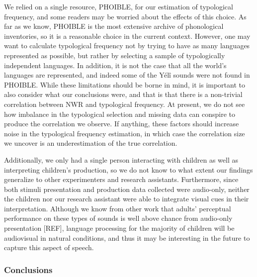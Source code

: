 \documentclass[
  english,
  ,man,floatsintext]{apa6}
\begin{document}
We relied on a single resource, PHOIBLE, for our estimation of typological frequency, and some readers may be worried about the effects of this choice. As far as we know, PHOIBLE is the most extensive archive of phonological inventories, so it is a reasonable choice in the current context. However, one may want to calculate typological frequency not by trying to have as many languages represented as possible, but rather by selecting a sample of typologically independent languages. In addition, it is not the case that all the world's languages are represented, and indeed some of the Yélî sounds were not found in PHOIBLE. While these limitations should be borne in mind, it is important to also consider what our conclusions were, and that is that there is a non-trivial correlation between NWR and typological frequency. At present, we do not see how imbalance in the typological selection and missing data can conspire to produce the correlation we observe. If anything, these factors should increase noise in the typological frequency estimation, in which case the correlation size we uncover is an underestimation of the true correlation.

Additionally, we only had a single person interacting with children as well as interpreting children's production, so we do not know to what extent our findings generalize to other experimenters and research assistants. Furthermore, since both stimuli presentation and production data collected were audio-only, neither the children nor our research assistant were able to integrate visual cues in their interpretation. Although we know from other work that adults' perceptual performance on these types of sounds is well above chance from audio-only presentation {[}REF{]}, language processing for the majority of children will be audiovisual in natural conditions, and thus it may be interesting in the future to capture this aspect of speech.

\hypertarget{conclusions}{%
\subsubsection{Conclusions}\label{conclusions}}
\end{document}
